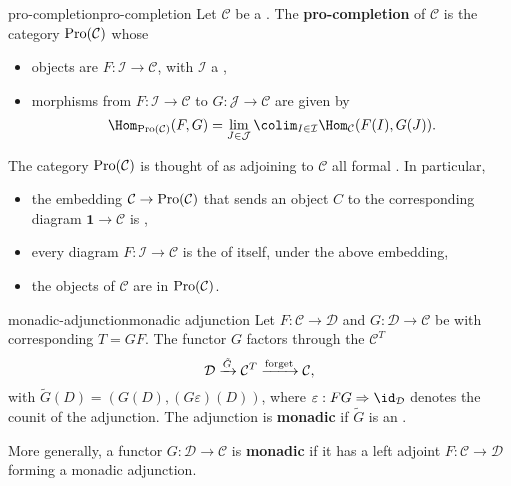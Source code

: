 \begin{topic}{pro-completion}{pro-completion}
    Let $\mathcal{C}$ be a . The \textbf{pro-completion} of $\mathcal{C}$ is the category $\textup{Pro}(\mathcal{C})$ whose
    \begin{itemize}
        \item objects are  $F : \mathcal{I} \to \mathcal{C}$, with $\mathcal{I}$ a  ,
        \item morphisms from $F : \mathcal{I} \to \mathcal{C}$ to $G : \mathcal{J} \to \mathcal{C}$ are given by
        \[ \Hom_{\textup{Pro}(\mathcal{C})}(F, G) = \lim_{J \in \mathcal{J}} \colim_{I \in \mathcal{I}} \Hom_\mathcal{C}(F(I), G(J)) . \]
    \end{itemize}
    The category $\textup{Pro}(\mathcal{C})$ is thought of as adjoining to $\mathcal{C}$ all formal . In particular,
    \begin{itemize}
        \item the embedding $\mathcal{C} \to \textup{Pro}(\mathcal{C})$ that sends an object $C$ to the corresponding diagram $\textbf{1} \to \mathcal{C}$ is  ,
        \item every diagram $F : \mathcal{I} \to \mathcal{C}$ is the  of itself, under the above embedding,
        \item the objects of $\mathcal{C}$ are  in $\textup{Pro}(\mathcal{C})$.
    \end{itemize}
\end{topic}

\begin{topic}{monadic-adjunction}{monadic adjunction}
    Let $F : \mathcal{C} \to \mathcal{D}$ and $G : \mathcal{D} \to \mathcal{C}$ be  with corresponding  $T = GF$. The functor $G$ factors through the  $\mathcal{C}^T$
    \[ \mathcal{D} \xrightarrow{\tilde{G}} \mathcal{C}^T \xrightarrow{\textup{forget}} \mathcal{C} , \]
    with $\tilde{G}(D) = (G(D), (G \varepsilon) (D))$, where $\varepsilon : FG \Rightarrow \id_\mathcal{D}$ denotes the counit of the adjunction. The adjunction is \textbf{monadic} if $\tilde{G}$ is an .
    
    More generally, a functor $G : \mathcal{D} \to \mathcal{C}$ is \textbf{monadic} if it has a left adjoint $F : \mathcal{C} \to \mathcal{D}$ forming a monadic adjunction.
\end{topic}

